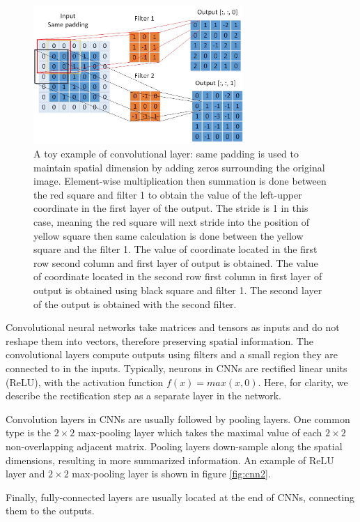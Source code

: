 \begin{figure}[th]
\centering
\includegraphics[width=80mm]{Figures/CNN}
\decoRule
\caption{A toy example of convolutional layer: same padding is used to maintain spatial dimension by adding zeros surrounding the original image. Element-wise multiplication then summation is done between the red square and filter 1 to obtain the value of the left-upper coordinate in the first layer of the output. The stride is 1 in this case, meaning the red square will next stride into the position of yellow square then same calculation is done between the yellow square and the filter 1. The value of coordinate located in the first row second column and first layer of output is obtained. The value of coordinate located in the second row first column in first layer of output is obtained using black square and filter 1. The second layer of the output is obtained with the second filter.}
\label{fig:cnn}
\end{figure}

Convolutional neural networks take matrices and tensors as inputs and do not reshape them into vectors, therefore preserving spatial information. The convolutional layers compute outputs using filters and a small region they are connected to in the inputs. Typically, neurons in CNNs are rectified linear units (ReLU), with the activation function  \(f(x) = max(x, 0)\). Here, for clarity, we describe the rectification step as a separate layer in the network.

Convolution layers in CNNs are usually followed by pooling layers. One common type is the \(2 \times 2\) max-pooling layer which takes the maximal value of each \(2 \times 2\) non-overlapping adjacent matrix. Pooling layers down-sample along the spatial dimensions, resulting in more summarized information. An example of ReLU layer and \(2 \times 2\) max-pooling layer is shown in figure \ref{fig:cnn2}. 

Finally, fully-connected layers are usually located at the end of CNNs, connecting them to the outputs. 

